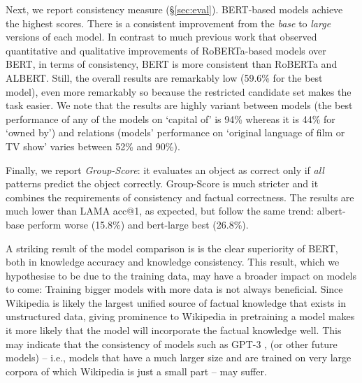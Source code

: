 Next, we report consistency measure (\S\ref{sec:eval}).
BERT-based models achieve the highest scores. There is a consistent improvement from the \textit{base} to \textit{large} versions of each model.
In contrast to much previous work that observed quantitative and qualitative improvements of RoBERTa-based models over BERT, in terms of consistency, BERT is more consistent than RoBERTa and ALBERT.
Still, the overall results are remarkably low (59.6\% for
the best model), %
even more remarkably so because the restricted candidate set
makes the task easier.
We note that the results are highly variant between models
(the best performance of any of the models on
`capital of' is 94\% whereas it is 44\% for `owned by')
and relations (models' performance on `original language of film or TV show'  varies between 52\% and 90\%).

Finally, we report
\emph{Group-Score}: it evaluates an object as correct only
if \emph{all} patterns predict the object
correctly. Group-Score is much stricter and it combines  the
requirements
of consistency and factual correctness.
The results are much lower than  LAMA acc@1, as expected,
but follow the same trend: albert-base perform worse (15.8\%) and bert-large  best  (26.8\%).






A striking result of the model comparison is
is the clear superiority of
BERT, both in knowledge accuracy and knowledge
consistency. This result, which we hypothesise to be due to
the training data, may have a broader impact on models to
come: Training bigger models with more data is not always
beneficial. Since Wikipedia is likely the largest unified source
of factual knowledge that exists in unstructured data,
giving prominence to Wikipedia in pretraining a model makes it more
likely that the model will incorporate the factual knowledge
well. 
This may indicate that  the consistency of models such as GPT-3 \cite{gpt3},
(or other future models) -- i.e., models that
have a much larger size and
are trained on very large corpora of
which Wikipedia is just a small part -- may suffer.

